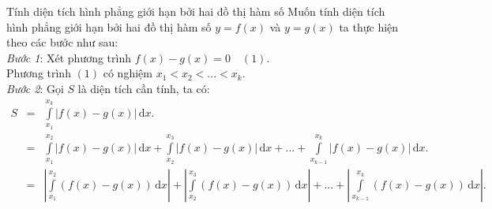 \begin{dang}{Tính diện tích hình phẳng giới hạn bởi hai đồ thị hàm số}
	Muốn tính diện tích hình phẳng giới hạn bởi hai đồ thị hàm số $y=f(x)$ và $y=g(x)$ ta thực hiện theo các bước như sau:\\
	\textit{Bước 1}: Xét phương trình $f(x) -g(x) = 0 \quad (1)$.\\
	Phương trình $(1)$ có nghiệm $x_1<x_2<...<x_k$.\\
	\textit{Bước 2}: Gọi $S$ là diện tích cần tính, ta có:\\
	$\begin{array}{*{20}{l}}
	S& = &\displaystyle \int \limits_{x_1}^{x_k} \left| f(x) - g(x)\right| \mathrm{\,d}x.\\
	& = &\displaystyle \int \limits_{x_1}^{x_2} \left| f(x) - g(x)\right| \mathrm{\,d}x + \displaystyle \int \limits_{x_2}^{x_3} \left| f(x) - g(x)\right| \mathrm{\,d}x + ... + \displaystyle \int \limits_{x_{k-1}}^{x_k} \left| f(x) - g(x)\right| \mathrm{\,d}x.\\
	&=&\left|\displaystyle \int \limits_{x_1}^{x_2} \left( f(x) - g(x) \right) \mathrm{\,d}x \right| + \left|\displaystyle \int \limits_{x_2}^{x_3} \left( f(x) - g(x) \right) \mathrm{\,d}x \right| + ... + \left| \displaystyle \int \limits_{x_{k-1}}^{x_k} \left( f(x) - g(x) \right) \mathrm{\,d}x \right|.
	\end{array}$
\end{dang}

